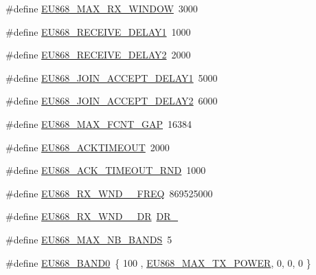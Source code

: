 \begin{DoxyCompactItemize}
\#define \mbox{\hyperlink{group___r_e_g_i_o_n_e_u868_ga7d51abf9369b7478a74590db5c5c2bb1}{E\+U868\+\_\+\+M\+A\+X\+\_\+\+R\+X\+\_\+\+W\+I\+N\+D\+OW}}~3000
\item 
\#define \mbox{\hyperlink{group___r_e_g_i_o_n_e_u868_ga5e54e03af0ee7ada0b1fd781009a24da}{E\+U868\+\_\+\+R\+E\+C\+E\+I\+V\+E\+\_\+\+D\+E\+L\+A\+Y1}}~1000
\item 
\#define \mbox{\hyperlink{group___r_e_g_i_o_n_e_u868_ga5b1785ed0935234e288f90a0461cd04b}{E\+U868\+\_\+\+R\+E\+C\+E\+I\+V\+E\+\_\+\+D\+E\+L\+A\+Y2}}~2000
\item 
\#define \mbox{\hyperlink{group___r_e_g_i_o_n_e_u868_gac37947128c2721653a6da84362c04f8c}{E\+U868\+\_\+\+J\+O\+I\+N\+\_\+\+A\+C\+C\+E\+P\+T\+\_\+\+D\+E\+L\+A\+Y1}}~5000
\item 
\#define \mbox{\hyperlink{group___r_e_g_i_o_n_e_u868_ga4b26a2e21778e0a790ab45637fb8f51f}{E\+U868\+\_\+\+J\+O\+I\+N\+\_\+\+A\+C\+C\+E\+P\+T\+\_\+\+D\+E\+L\+A\+Y2}}~6000
\item 
\#define \mbox{\hyperlink{group___r_e_g_i_o_n_e_u868_ga82b9bba1cf3046bb808448af3a3851a6}{E\+U868\+\_\+\+M\+A\+X\+\_\+\+F\+C\+N\+T\+\_\+\+G\+AP}}~16384
\item 
\#define \mbox{\hyperlink{group___r_e_g_i_o_n_e_u868_ga0d482880b3686526074336cc53d3a711}{E\+U868\+\_\+\+A\+C\+K\+T\+I\+M\+E\+O\+UT}}~2000
\item 
\#define \mbox{\hyperlink{group___r_e_g_i_o_n_e_u868_gaf263a9c127c374ca28a18dee1f63dcf4}{E\+U868\+\_\+\+A\+C\+K\+\_\+\+T\+I\+M\+E\+O\+U\+T\+\_\+\+R\+ND}}~1000
\item 
\#define \mbox{\hyperlink{group___r_e_g_i_o_n_e_u868_ga6cc4e22e8e2b73a7e1789ff22b6d4d76}{E\+U868\+\_\+\+R\+X\+\_\+\+W\+N\+D\+\_\+\_\+\+F\+R\+EQ}}~869525000
\item 
\#define \mbox{\hyperlink{group___r_e_g_i_o_n_e_u868_ga291302a83db2690d26b2659853262abe}{E\+U868\+\_\+\+R\+X\+\_\+\+W\+N\+D\+\_\+\_\+\+DR}}~\mbox{\hyperlink{group___r_e_g_i_o_n_ga6c4ef966b4f3d5eb7597b087f2b97095}{D\+R\+\_}}
\item 
\#define \mbox{\hyperlink{group___r_e_g_i_o_n_e_u868_gac5749114ab11499796ef455491fe8997}{E\+U868\+\_\+\+M\+A\+X\+\_\+\+N\+B\+\_\+\+B\+A\+N\+DS}}~5
\item 
\#define \mbox{\hyperlink{group___r_e_g_i_o_n_e_u868_gadf9e5ce0c5061df64ab9105bba178fb5}{E\+U868\+\_\+\+B\+A\+N\+D0}}~\{ 100 , \mbox{\hyperlink{group___r_e_g_i_o_n_e_u868_ga39e338c7f8454f594302811f61d9560d}{E\+U868\+\_\+\+M\+A\+X\+\_\+\+T\+X\+\_\+\+P\+O\+W\+ER}}, 0, 0, 0 \}
\item 

\end{DoxyCompactItemize}
